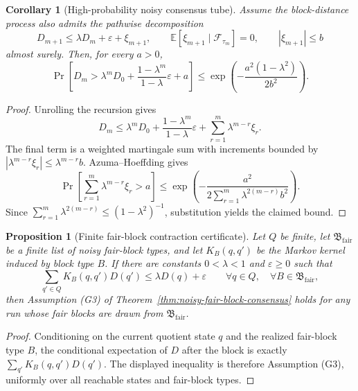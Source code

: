 \documentclass[11pt]{article}
\newtheorem{corollary}[theorem]{Corollary}
\newtheorem{proposition}[theorem]{Proposition}
\theoremstyle{remark}
\theoremstyle{plain}
\begin{document}
\begin{corollary}[High-probability noisy consensus tube]
\label{cor:high-prob-noisy-tube}
Assume the block-distance process also admits the pathwise decomposition
\[
D_{m+1}
\le
\lambda D_m+\varepsilon+\xi_{m+1},
\qquad
\mathbb E[\xi_{m+1}\mid\mathcal F_{\tau_m}]=0,
\qquad
|\xi_{m+1}|\le b
\]
almost surely. Then, for every \(a>0\),
\[
\Pr\!\left[
D_m>
\lambda^mD_0
+
\frac{1-\lambda^m}{1-\lambda}\varepsilon
+
a
\right]
\le
\exp\!\left(
-\frac{a^2(1-\lambda^2)}{2b^2}
\right).
\]
\end{corollary}

\begin{proof}
Unrolling the recursion gives
\[
D_m
\le
\lambda^mD_0
+
\frac{1-\lambda^m}{1-\lambda}\varepsilon
+
\sum_{r=1}^{m}\lambda^{m-r}\xi_r.
\]
The final term is a weighted martingale sum with increments bounded by
\(|\lambda^{m-r}\xi_r|\le\lambda^{m-r}b\). Azuma--Hoeffding gives
\[
\Pr\!\left[
\sum_{r=1}^{m}\lambda^{m-r}\xi_r>a
\right]
\le
\exp\!\left(
-\frac{a^2}{2\sum_{r=1}^{m}\lambda^{2(m-r)}b^2}
\right).
\]
Since \(\sum_{r=1}^{m}\lambda^{2(m-r)}\le(1-\lambda^2)^{-1}\), substitution yields the claimed
bound.
\end{proof}

\begin{proposition}[Finite fair-block contraction certificate]
\label{prop:finite-fair-block-certificate}
Let \(Q\) be finite, let \(\mathfrak B_{\mathrm{fair}}\) be a finite list of noisy fair-block
types, and let \(K_B(q,q')\) be the Markov kernel induced by block type \(B\). If there are
constants \(0<\lambda<1\) and \(\varepsilon\ge0\) such that
\[
\sum_{q'\in Q}K_B(q,q')D(q')
\le
\lambda D(q)+\varepsilon
\qquad
\forall q\in Q,\quad \forall B\in\mathfrak B_{\mathrm{fair}},
\]
then Assumption (G3) of Theorem~\ref{thm:noisy-fair-block-consensus} holds for any run whose
fair blocks are drawn from \(\mathfrak B_{\mathrm{fair}}\).
\end{proposition}

\begin{proof}
Conditioning on the current quotient state \(q\) and the realized fair-block type \(B\), the
conditional expectation of \(D\) after the block is exactly
\(\sum_{q'}K_B(q,q')D(q')\). The displayed inequality is therefore Assumption (G3), uniformly
over all reachable states and fair-block types.
\end{proof}
\end{document}
